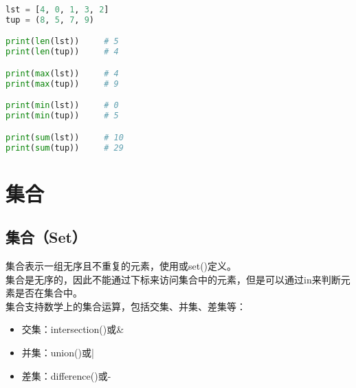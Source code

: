\begin{table}[H]
	\centering
	\caption{序列统计函数}
\end{table}

\begin{lstlisting}[language=Python]
lst = [4, 0, 1, 3, 2]
tup = (8, 5, 7, 9)

print(len(lst))		# 5
print(len(tup))		# 4

print(max(lst))		# 4
print(max(tup))		# 9

print(min(lst))		# 0
print(min(tup))		# 5

print(sum(lst))		# 10
print(sum(tup))		# 29
\end{lstlisting}

\newpage

\section{集合}

\subsection{集合（Set）}

集合表示一组无序且不重复的元素，使用{}或set()定义。\\

集合是无序的，因此不能通过下标来访问集合中的元素，但是可以通过in来判断元素是否在集合中。\\

集合支持数学上的集合运算，包括交集、并集、差集等：

\begin{itemize}
	\item 交集：intersection()或\&
	\item 并集：union()或|
	\item 差集：difference()或-
\end{itemize}

